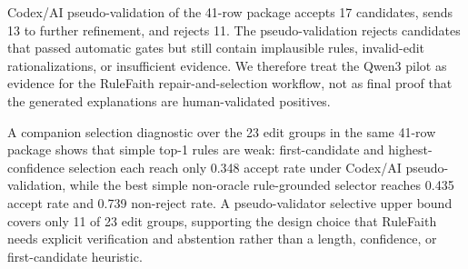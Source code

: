 Codex/AI pseudo-validation of the 41-row package accepts 17 candidates, sends 13 to further refinement, and rejects 11. The pseudo-validation rejects candidates that passed automatic gates but still contain implausible rules, invalid-edit rationalizations, or insufficient evidence. We therefore treat the Qwen3 pilot as evidence for the RuleFaith repair-and-selection workflow, not as final proof that the generated explanations are human-validated positives.

A companion selection diagnostic over the 23 edit groups in the same 41-row package shows that simple top-1 rules are weak: first-candidate and highest-confidence selection each reach only 0.348 accept rate under Codex/AI pseudo-validation, while the best simple non-oracle rule-grounded selector reaches 0.435 accept rate and 0.739 non-reject rate. A pseudo-validator selective upper bound covers only 11 of 23 edit groups, supporting the design choice that RuleFaith needs explicit verification and abstention rather than a length, confidence, or first-candidate heuristic.
